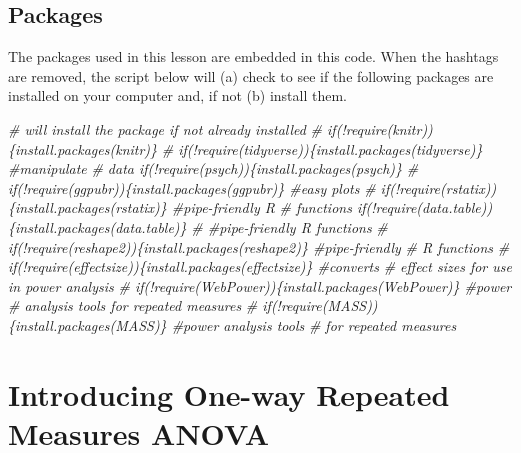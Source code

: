 \documentclass[
  11pt,
]{book}
\newenvironment{Shaded}{\begin{snugshade}}{\end{snugshade}}
\newcommand{\CommentTok}[1]{\textcolor[rgb]{0.37,0.37,0.37}{\textit{#1}}}
\begin{document}
\hypertarget{packages-5}{%
\subsection{Packages}\label{packages-5}}

The packages used in this lesson are embedded in this code. When the hashtags are removed, the script below will (a) check to see if the following packages are installed on your computer and, if not (b) install them.

\begin{Shaded}
\begin{Highlighting}[]
\CommentTok{\# will install the package if not already installed}
\CommentTok{\# if(!require(knitr))\{install.packages(\textquotesingle{}knitr\textquotesingle{})\}}
\CommentTok{\# if(!require(tidyverse))\{install.packages(\textquotesingle{}tidyverse\textquotesingle{})\} \#manipulate}
\CommentTok{\# data if(!require(psych))\{install.packages(\textquotesingle{}psych\textquotesingle{})\}}
\CommentTok{\# if(!require(ggpubr))\{install.packages(\textquotesingle{}ggpubr\textquotesingle{})\} \#easy plots}
\CommentTok{\# if(!require(rstatix))\{install.packages(\textquotesingle{}rstatix\textquotesingle{})\} \#pipe{-}friendly R}
\CommentTok{\# functions if(!require(data.table))\{install.packages(\textquotesingle{}data.table\textquotesingle{})\}}
\CommentTok{\# \#pipe{-}friendly R functions}
\CommentTok{\# if(!require(reshape2))\{install.packages(\textquotesingle{}reshape2\textquotesingle{})\} \#pipe{-}friendly}
\CommentTok{\# R functions}
\CommentTok{\# if(!require(effectsize))\{install.packages(\textquotesingle{}effectsize\textquotesingle{})\} \#converts}
\CommentTok{\# effect sizes for use in power analysis}
\CommentTok{\# if(!require(WebPower))\{install.packages(\textquotesingle{}WebPower\textquotesingle{})\} \#power}
\CommentTok{\# analysis tools for repeated measures}
\CommentTok{\# if(!require(MASS))\{install.packages(\textquotesingle{}MASS\textquotesingle{})\} \#power analysis tools}
\CommentTok{\# for repeated measures}
\end{Highlighting}
\end{Shaded}

\hypertarget{introducing-one-way-repeated-measures-anova}{%
\section{Introducing One-way Repeated Measures ANOVA}\label{introducing-one-way-repeated-measures-anova}}
\end{document}
